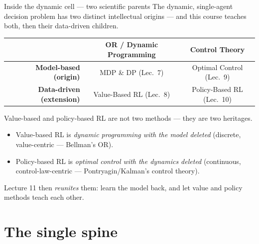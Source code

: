\documentclass[10pt, aspectratio=169]{beamer}
\begin{document}
\begin{frame}{Inside the dynamic cell --- two scientific parents}
The dynamic, single-agent decision problem has \alert{two distinct intellectual origins} --- and this course teaches both, then their data-driven children.
\medskip
\begin{center}\footnotesize\renewcommand{\arraystretch}{1.4}
\begin{tabular}{r|c|c}
 & \textbf{OR / Dynamic Programming} & \textbf{Control Theory} \\
\hline
\textbf{Model-based (origin)} & MDP \& DP \scriptsize(Lec.\ 7) & Optimal Control \scriptsize(Lec.\ 9)\\
\hline
\textbf{Data-driven (extension)} & Value-Based RL \scriptsize(Lec.\ 8) & Policy-Based RL \scriptsize(Lec.\ 10)\\
\end{tabular}
\end{center}
\medskip

\pause
\begin{center}\large
\alert{Value-based and policy-based RL are not two methods --- they are two heritages.}
\end{center}
\begin{itemize}\setlength\itemsep{1pt}
\item Value-based RL is \emph{dynamic programming with the model deleted} (discrete, value-centric --- Bellman's OR).
\item Policy-based RL is \emph{optimal control with the dynamics deleted} (continuous, control-law-centric --- Pontryagin/Kalman's control theory).
\end{itemize}
\pause
Lecture 11 then \emph{reunites} them: learn the model back, and let value and policy methods teach each other.
\end{frame}

\section{The single spine}
\end{document}

